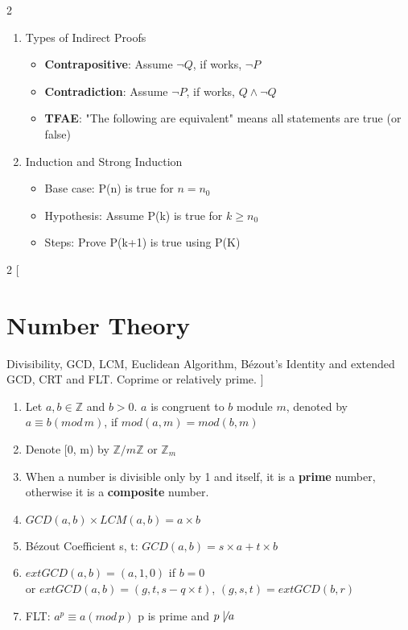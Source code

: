 \documentclass[]{article}
\begin{document}
\begin{multicols}{2}
\begin{enumerate}
  \item Types of Indirect Proofs
    \begin{itemize}
        \item \textbf{Contrapositive}: Assume $\neg Q$, if works, $\neg P$
        \item \textbf{Contradiction}: Assume $\neg P$, if works, $Q \land \neg Q$
        \item \textbf{TFAE}: "The following are equivalent" means all statements are true (or false)
    \end{itemize}
  \item Induction and Strong Induction
    \begin{itemize}
      \item Base case: P(n) is true for $n = n_0$ 
      \item Hypothesis: Assume P(k) is true for $k \geq n_0$
      \item Steps: Prove P(k+1) is true using P(K)
    \end{itemize}
  
\end{enumerate}

\end{multicols}

\begin{multicols}{2}
[
\section{Number Theory}
Divisibility, GCD, LCM, Euclidean Algorithm, Bézout's Identity and extended GCD, CRT and FLT. Coprime or relatively prime.
]

\begin{enumerate}
    \item Let $a, b \in \mathbb{Z}$ and $b > 0$. $a$ is congruent to $b$ module $m$,
    denoted by $a \equiv b (mod\, m)$, if $mod(a, m) = mod(b, m)$
    \item Denote [0, m) by $\mathbb{Z}/m\mathbb{Z}$ or $\mathbb{Z}_m$
    \item When a number is divisible only by 1 and itself, it is a \textbf{prime} number, otherwise it is a \textbf{composite} number.
    \item $GCD(a, b) \times LCM(a, b) = a \times b$
    \item Bézout Coefficient s, t: $GCD(a, b) = s \times a + t \times b$
    \item $extGCD(a, b) = (a, 1, 0)$ if $b = 0$ \\
    or $extGCD(a, b) = (g, t, s - q \times t)$, $(g, s, t) = extGCD(b, r)$
    \item FLT: $a^p \equiv a (mod\, p)$ p is prime and $p \not \mid a$
\end{enumerate}

\end{multicols}
\end{document}
